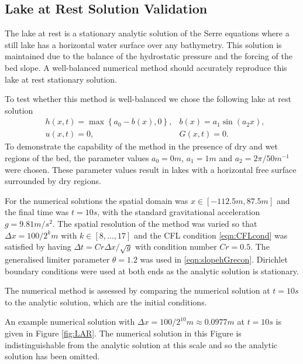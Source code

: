 \documentclass[times]{elsarticle}
\begin{document}
\subsection{Lake at Rest Solution Validation}
The lake at rest is a stationary analytic solution of the Serre equations where a still lake has a horizontal water surface over any bathymetry. This solution is maintained due to the balance of the hydrostatic pressure and the forcing of the bed slope. A well-balanced numerical method should accurately reproduce this lake at rest stationary solution.

To test whether this method is well-balanced we chose the following lake at rest solution
	\begin{align*}
	&h(x,t) = \max\left\lbrace a_0 - b(x), 0 \right\rbrace, & b(x) = a_1 \sin\left(a_2 x\right), \\
	&u(x,t) = 0 , 	&G(x,t) = 0.
	\end{align*}
To demonstrate the capability of the method in the presence of dry and wet regions of the bed, the parameter values $a_0 = 0m$, $a_1 = 1m$ and $a_2 = 2 \pi / 50 m^{-1} $ were chosen. These parameter values result in lakes with a horizontal free surface surrounded by dry regions.

For the numerical solutions the spatial domain was $x \in \left[-112.5 m,87.5 m\right]$ and the final time was $t=10s$, with the standard gravitational acceleration $g= 9.81 m/s^2$. The spatial resolution of the method was varied so that $\Delta x = 100 / 2^k m$ with $k \in \left[8, \dots ,17\right]$ and the CFL condition \eqref{eqn:CFLcond} was satisfied by having $\Delta t = Cr \Delta x / \sqrt{g}$ with condition number $Cr = 0.5$. The generalised limiter parameter $\theta = 1.2$ was used in \eqref{eqn:slopehGrecon}. Dirichlet boundary conditions were used at both ends as the analytic solution is stationary.

The numerical method is assessed by comparing the numerical solution at $t=10s$ to the analytic solution, which are the initial conditions.

An example numerical solution with $\Delta x = 100/2^{10}m \approx 0.0977m$ at $t=10s$ is given in Figure \ref{fig:LAR}. The numerical solution in this Figure is indistinguishable from the analytic solution at this scale and so the analytic solution has been omitted.
\end{document}
